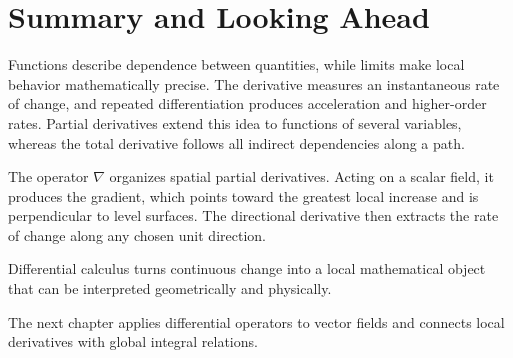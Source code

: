 \section{Summary and Looking Ahead}
\label{sec:differential-calculus-summary}

Functions describe dependence between quantities, while limits make local behavior mathematically precise. The derivative measures an instantaneous rate of change, and repeated differentiation produces acceleration and higher-order rates. Partial derivatives extend this idea to functions of several variables, whereas the total derivative follows all indirect dependencies along a path.

The operator \(\nabla\) organizes spatial partial derivatives. Acting on a scalar field, it produces the gradient, which points toward the greatest local increase and is perpendicular to level surfaces. The directional derivative then extracts the rate of change along any chosen unit direction.

\begin{booksummary}
Differential calculus turns continuous change into a local mathematical object that can be interpreted geometrically and physically.
\end{booksummary}

The next chapter applies differential operators to vector fields and connects local derivatives with global integral relations.
